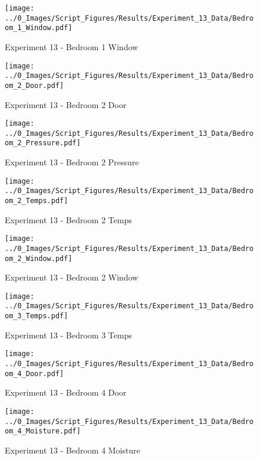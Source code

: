 	\clearpage

	\begin{figure}[H]
		\centering
		\texttt{[image: ../0\_Images/Script\_Figures/Results/Experiment\_13\_Data/Bedroom\_1\_Window.pdf]}
		\caption[]{Experiment 13 - Bedroom 1 Window}
	\end{figure}
 

	\begin{figure}[H]
		\centering
		\texttt{[image: ../0\_Images/Script\_Figures/Results/Experiment\_13\_Data/Bedroom\_2\_Door.pdf]}
		\caption[]{Experiment 13 - Bedroom 2 Door}
	\end{figure}
 
	\clearpage

	\begin{figure}[H]
		\centering
		\texttt{[image: ../0\_Images/Script\_Figures/Results/Experiment\_13\_Data/Bedroom\_2\_Pressure.pdf]}
		\caption[]{Experiment 13 - Bedroom 2 Pressure}
	\end{figure}
 

	\begin{figure}[H]
		\centering
		\texttt{[image: ../0\_Images/Script\_Figures/Results/Experiment\_13\_Data/Bedroom\_2\_Temps.pdf]}
		\caption[]{Experiment 13 - Bedroom 2 Temps}
	\end{figure}
 
	\clearpage

	\begin{figure}[H]
		\centering
		\texttt{[image: ../0\_Images/Script\_Figures/Results/Experiment\_13\_Data/Bedroom\_2\_Window.pdf]}
		\caption[]{Experiment 13 - Bedroom 2 Window}
	\end{figure}
 

	\begin{figure}[H]
		\centering
		\texttt{[image: ../0\_Images/Script\_Figures/Results/Experiment\_13\_Data/Bedroom\_3\_Temps.pdf]}
		\caption[]{Experiment 13 - Bedroom 3 Temps}
	\end{figure}
 
	\clearpage

	\begin{figure}[H]
		\centering
		\texttt{[image: ../0\_Images/Script\_Figures/Results/Experiment\_13\_Data/Bedroom\_4\_Door.pdf]}
		\caption[]{Experiment 13 - Bedroom 4 Door}
	\end{figure}
 

	\begin{figure}[H]
		\centering
		\texttt{[image: ../0\_Images/Script\_Figures/Results/Experiment\_13\_Data/Bedroom\_4\_Moisture.pdf]}
		\caption[]{Experiment 13 - Bedroom 4 Moisture}
	\end{figure}
 
